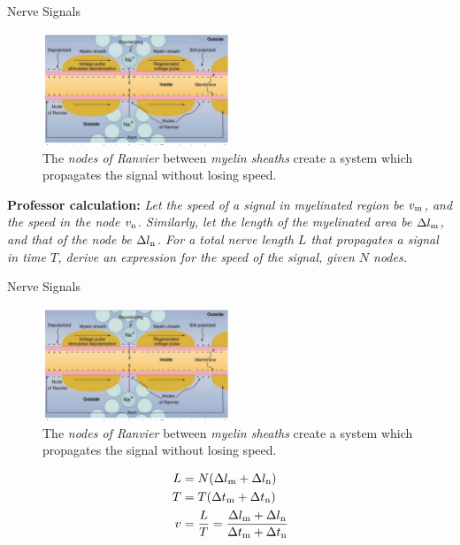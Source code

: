 \documentclass{beamer}
\begin{document}
\begin{frame}{Nerve Signals}
\begin{figure}
\centering
\includegraphics[width=0.5\textwidth]{figures/nerve5.png}
\caption{\label{fig:nerve4} The \textit{nodes of Ranvier} between \textit{myelin sheaths} create a system which propagates the signal without losing speed.}
\end{figure}
\small
\textbf{Professor calculation:} \textit{Let the speed of a signal in myelinated region be $v_{\rm m}$, and the speed in the node $v_{\rm n}$. Similarly, let the length of the myelinated area be $\Delta l_{\rm m}$, and that of the node be $\Delta l_{\rm n}$.  For a total nerve length $L$ that propagates a signal in time $T$, derive an expression for the speed of the signal, given $N$ nodes.}
\end{frame}

\begin{frame}{Nerve Signals}
\begin{figure}
\centering
\includegraphics[width=0.5\textwidth]{figures/nerve5.png}
\caption{\label{fig:nerve4a} The \textit{nodes of Ranvier} between \textit{myelin sheaths} create a system which propagates the signal without losing speed.}
\end{figure}
\small
\begin{align}
L &= N(\Delta l_{\rm m} + \Delta l_{\rm n}) \\
T &= T(\Delta t_{\rm m} + \Delta t_{\rm n}) \\ 
v &= \frac{L}{T} = \frac{\Delta l_{\rm m} + \Delta l_{\rm n}}{\Delta t_{\rm m} + \Delta t_{\rm n}}
\end{align}
\end{frame}
\end{document}
